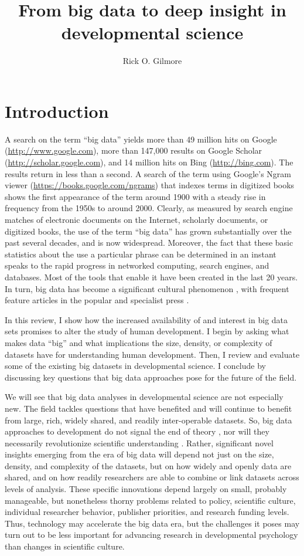 \documentclass[letterpaper,man,apacite,natbib]{apa6}
\title{From big data to deep insight in developmental science}
\author{Rick O. Gilmore}
\affiliation{{The Pennsylvania State University}, {The Databrary Project}}
\begin{document}
\maketitle

\section{Introduction}
A search on the term ``big data'' yields more than 49 million hits on Google (\url{http://www.google.com}), more than 147,000 results on Google Scholar (\url{http://scholar.google.com}), and 14 million hits on Bing (\url{http://bing.com}).
The results return in less than a second.
A search of the term using Google's Ngram viewer (\url{https://books.google.com/ngrams}) that indexes terms in digitized books shows the first appearance of the term around 1900 with a steady rise in frequency from the 1950s to around 2000.
Clearly, as measured by search engine matches of electronic documents on the Internet, scholarly documents, or digitized books, the use of the term ``big data'' has grown substantially over the past several decades, and is now widespread.
Moreover, the fact that these basic statistics about the use a particular phrase can be determined in an instant speaks to the rapid progress in networked computing, search engines, and databases.
Most of the tools that enable it have been created in the last 20 years.
In turn, big data has become a significant cultural phenomenon \cite{borgman_big_2015,boyd_critical_2012}, with frequent feature articles in the popular \cite{lohr_big_2012,Marcus2013} and specialist press \cite{HBR2015,Press2013a}.

In this review, I show how the increased availability of and interest in big data sets promises to alter the study of human development.
I begin by asking what makes data ``big'' and what implications the size, density, or complexity of datasets have for understanding human development.
Then, I review and evaluate some of the existing big datasets in developmental science.
I conclude by discussing key questions that big data approaches pose for the future of the field.

We will see that big data analyses in developmental science are not especially new.
The field tackles questions that have benefited and will continue to benefit from large, rich, widely shared, and readily inter-operable datasets.
So, big data approaches to development do not signal the end of theory \cite{anderson_end_2008}, nor will they necessarily revolutionize scientific understanding \cite{boyd_critical_2012}. 
Rather, significant novel insights emerging from the era of big data will depend not just on the size, density, and complexity of the datasets, but on how widely and openly data are shared, and on how readily researchers are able to combine or link datasets across levels of analysis.
These specific innovations depend largely on small, probably manageable, but nonetheless thorny problems related to policy, scientific culture, individual researcher behavior, publisher priorities, and research funding levels.
Thus, technology may accelerate the big data era, but the challenges it poses may turn out to be less important for advancing research in developmental psychology than changes in scientific culture.
\end{document}
